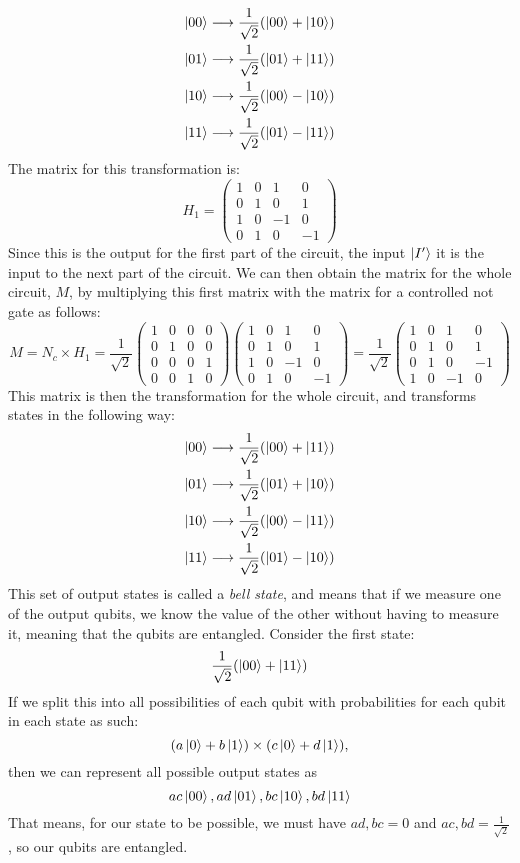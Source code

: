 \begin{align*}
    \ket{00} \longrightarrow \frac{1}{\sqrt{2}}(\ket{00} + \ket{10})\\
    \ket{01} \longrightarrow \frac{1}{\sqrt{2}}(\ket{01} + \ket{11})\\
    \ket{10} \longrightarrow \frac{1}{\sqrt{2}}(\ket{00} - \ket{10})\\
    \ket{11} \longrightarrow \frac{1}{\sqrt{2}}(\ket{01} - \ket{11})
\end{align*}
The matrix for this transformation is:
$$ H_1 = 
\begin{pmatrix}
1 & 0 & 1 & 0\\
0 & 1 & 0 & 1\\
1 & 0 & -1 & 0\\
0 & 1 & 0 & -1
\end{pmatrix}
$$
Since this is the output for the first part of the circuit, the input $\ket{I'}$ it is the input to the next part of the circuit. We can then obtain the matrix for the whole circuit, $M$, by multiplying this first matrix with the matrix for a controlled not gate as follows:
$$
M = N_c\times H_1 = \frac{1}{\sqrt{2}}
\begin{pmatrix}
1 & 0 & 0 & 0\\
0 & 1 & 0 & 0\\
0 & 0 & 0 & 1\\
0 & 0 & 1 & 0
\end{pmatrix}
\begin{pmatrix}
1 & 0 & 1 & 0\\
0 & 1 & 0 & 1\\
1 & 0 & -1 & 0\\
0 & 1 & 0 & -1
\end{pmatrix} = \frac{1}{\sqrt{2}}
\begin{pmatrix}
1 & 0 & 1 & 0\\
0 & 1 & 0 & 1\\
0 & 1 & 0 & -1\\
1 & 0 & -1 & 0
\end{pmatrix}
$$
This matrix is then the transformation for the whole circuit, and transforms states in the following way:
\begin{align*}
    \ket{00} \longrightarrow \frac{1}{\sqrt{2}}(\ket{00} + \ket{11})\\
    \ket{01} \longrightarrow \frac{1}{\sqrt{2}}(\ket{01} + \ket{10})\\
    \ket{10} \longrightarrow \frac{1}{\sqrt{2}}(\ket{00} - \ket{11})\\
    \ket{11} \longrightarrow \frac{1}{\sqrt{2}}(\ket{01} - \ket{10})
\end{align*}
This set of output states is called a \emph{bell state}, and means that if we measure one of the output qubits, we know the value of the other without having to measure it, meaning that the qubits are entangled. Consider the first state: $$\frac{1}{\sqrt{2}}(\ket{00} + \ket{11})$$
If we split this into all possibilities of each qubit with probabilities for each qubit in each state as such:
$$(a\ket{0} + b\ket{1}) \times (c\ket{0} + d\ket{1}),$$
then we can represent all possible output states as
$$ac\ket{00}, ad\ket{01}, bc\ket{10}, bd\ket{11}$$
That means, for our state to be possible, we must have $ad,bc=0$ and $ac,bd=\frac{1}{\sqrt{2}}$, so our qubits are entangled.
